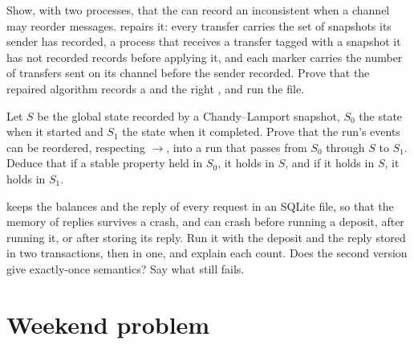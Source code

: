 \begin{exercise}[$\star\star\star$]\label{exo:b3:distributed-systems:10}
Show, with two processes, that the  can record an inconsistent  when a channel may reorder messages.  repairs it: every transfer carries the set of snapshots its sender has recorded, a process that receives a transfer tagged with a snapshot it has not recorded records before applying it, and each marker carries the number of transfers sent on its channel before the sender recorded. Prove that the repaired algorithm records a  and the right , and run the file.
\end{exercise}

\begin{exercise}[$\star\star\star$]\label{exo:b3:distributed-systems:11}
Let $S$ be the global state recorded by a Chandy--Lamport snapshot, $S_0$ the state when it started and $S_1$ the state when it completed. Prove that the run's events can be reordered, respecting $\to$, into a run that passes from $S_0$ through $S$ to $S_1$. Deduce that if a stable property held in $S_0$, it holds in $S$, and if it holds in $S$, it holds in $S_1$.
\end{exercise}

\begin{exercise}[$\star\star\star$]\label{exo:b3:distributed-systems:12}
 keeps the balances and the reply of every request in an SQLite file, so that the memory of replies survives a crash, and can crash before running a deposit, after running it, or after storing its reply. Run it with the deposit and the reply stored in two transactions, then in one, and explain each count. Does the second version give exactly-once semantics? Say what still fails.
\end{exercise}

\section{Weekend problem}\label{sec:b3:distributed-systems:problem}

